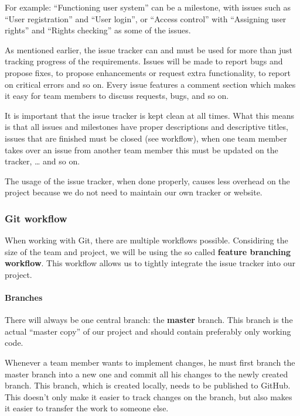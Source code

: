 \documentclass[12pt]{article}
\begin{document}
For example: ``Functioning user system'' can be a milestone, with issues
such as ``User registration'' and ``User login'', or ``Access control''
with ``Assigning user rights'' and ``Rights checking'' as some of the
issues.

As mentioned earlier, the issue tracker can and must be used for more
than just tracking progress of the requirements. Issues will be made to
report bugs and propose fixes, to propose enhancements or request extra
functionality, to report on critical errors and so on. Every issue
features a comment section which makes it easy for team members to
discuss requests, bugs, and so on.

It is important that the issue tracker is kept clean at all times. What
this means is that all issues and milestones have proper descriptions
and descriptive titles, issues that are finished must be closed (see
workflow), when one team member takes over an issue from another team
member this must be updated on the tracker, \ldots{} and so on.

The usage of the issue tracker, when done properly, causes less overhead
on the project because we do not need to maintain our own tracker or
website.

\subsubsection{Git workflow}\label{git-workflow}

When working with Git, there are multiple workflows possible.
Considiring the size of the team and project, we will be using the so
called \textbf{feature branching workflow}. This workflow allows us to
tightly integrate the issue tracker into our project.

\paragraph{Branches}\label{branches}

There will always be one central branch: the \textbf{master} branch.
This branch is the actual ``master copy'' of our project and should
contain preferably only working code.

Whenever a team member wants to implement changes, he must first branch
the master branch into a new one and commit all his changes to the newly
created branch. This branch, which is created locally, needs to be
published to GitHub. This doesn't only make it easier to track changes
on the branch, but also makes it easier to transfer the work to someone
else.
\end{document}
